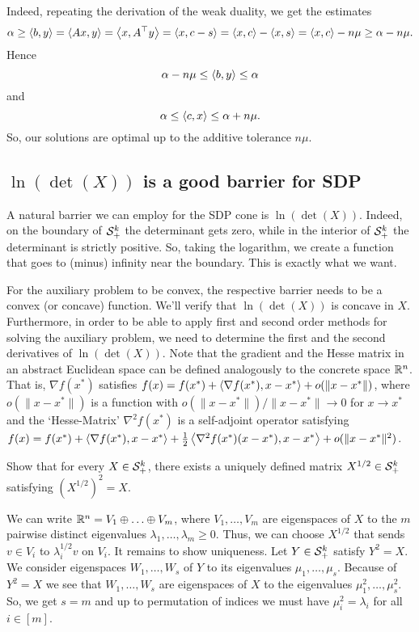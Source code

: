 	Indeed, repeating the derivation of the weak duality, we get the estimates
	\[
		\alpha \ge \left\langle b , y \right\rangle = \left\langle A x , y \right\rangle= \left\langle x , A^\top y \right\rangle = \left\langle x , c-s \right\rangle = \left\langle x , c \right\rangle - \left\langle x , s \right\rangle = \left\langle x , c \right\rangle - n \mu \ge \alpha - n \mu.
	\]
	Hence 
	\[
		\alpha - n \mu \le \left\langle b , y \right\rangle \le \alpha 
	\]
	and 
	\[
		\alpha \le \left\langle c , x \right\rangle \le \alpha + n \mu.
	\]
	So, our solutions are optimal up to the additive tolerance $n \mu$. 

\subsection{\texorpdfstring{$\ln(\det(X))$}{ln(det(X))} is a good barrier for SDP}

A natural barrier we can employ for the SDP cone is $\ln(\det(X))$. Indeed, on the boundary of $\mathcal{S}_+^k$ the determinant gets zero, while in the interior of $\mathcal{S}_+^k$ the determinant is strictly positive. So, taking the logarithm, we create a function that goes to (minus) infinity near the boundary. This is exactly what we want. 

For the auxiliary problem to be convex, the respective barrier needs to be a convex (or concave) function. We'll verify that $\ln(\det(X))$ is concave in $X$. Furthermore, in order to be able to apply first and second order methods for solving the auxiliary problem, we need to determine the first and the second derivatives of $\ln(\det(X))$. Note that the gradient and the Hesse matrix in an abstract Euclidean space can be defined analogously to the concrete space $\mathbb{R}^n$. That is, $\nabla f(x^\ast)$ satisfies $f(x) = f(x^\ast) + \left\langle \nabla f(x^\ast) , x-x^\ast \right\rangle + o(\|x-x^\ast\|)$, where $o(\|x-x^\ast\|)$ is a function with $o(\|x-x^\ast\|) / \|x-x^\ast\| \to 0$ for $x \to x^\ast$ and the `Hesse-Matrix' $\nabla^2 f(x^\ast)$ is a self-adjoint operator satisfying $f(x) = f(x^\ast) + \left\langle \nabla f(x^\ast) , x-x^\ast \right\rangle + \frac{1}{2} \left\langle \nabla^2 f(x^\ast) (x-x^\ast) , x-x^\ast \right\rangle + o(\|x-x^\ast\|^2)$. 


\begin{exercise}
	\label{matrix:root}
	Show that for every $X \in \mathcal{S}_+^k$, there exists a uniquely defined matrix $X^{1/2} \in \mathcal{S}_+^k$ satisfying $(X^{1/2})^2 = X$. 
\end{exercise}
\begin{solution}
	We can write $\mathbb{R}^n = V_1 \oplus \ldots \oplus V_m$, where $V_1,\ldots,V_m$ are eigenspaces of $X$ to the $m$ pairwise distinct eigenvalues $\lambda_1,\ldots,\lambda_m \ge 0$. Thus, we can choose $X^{1/2}$ that sends $v \in V_i$ to $\lambda_i^{1/2} v$ on $V_i$. It remains to show uniqueness. Let $Y \in \mathcal{S}_+^k$ satisfy $Y^2 = X$. We consider eigenspaces $W_1,\ldots,W_s$ of $Y$ to its eigenvalues $\mu_1,\ldots,\mu_s$. Because of $Y^2=X$ we see that $W_1,\ldots,W_s$ are eigenspaces of $X$ to the eigenvalues $\mu_1^2,\ldots,\mu_s^2$. So, we get $s=m$ and up to permutation of indices we must have $\mu_i^2 = \lambda_i$ for all $i \in [m]$.
\end{solution}

